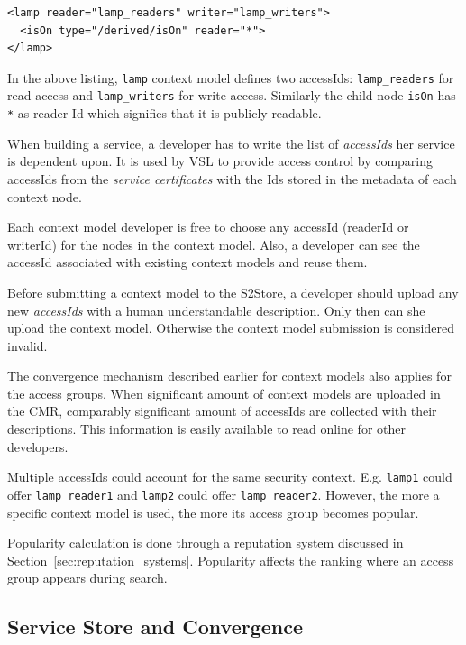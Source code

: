 \begin{lstlisting}[caption=Listing of lamp context model with \texttt{readerId} and \texttt{writerId} permissions.]
<lamp reader="lamp_readers" writer="lamp_writers">
  <isOn type="/derived/isOn" reader="*">
</lamp>
\end{lstlisting}

In the above listing, \texttt{lamp} context model defines two accessIds: \texttt{lamp\_readers} for read access and \texttt{lamp\_writers} for write access. Similarly the child node \texttt{isOn} has \texttt{*} as reader Id which signifies that it is publicly readable.

When building a service, a developer has to write the list of \emph{accessIds} her service is dependent upon. It is used by VSL to provide access control by comparing accessIds from the \emph{service certificates} with the Ids stored in the metadata of each context node.

Each context model developer is free to choose any accessId (readerId or writerId) for the nodes in the context model. Also, a developer can see the accessId associated with existing context models and reuse them.

Before submitting a context model to the S2Store, a developer should upload any new \emph{accessIds} with a human understandable description. Only then can she upload the context model. Otherwise the context model submission is considered invalid.

The convergence mechanism described earlier for context models also applies for the access groups. When significant amount of context models are uploaded in the CMR, comparably significant amount of accessIds are collected with their descriptions. This information is easily available to read online for other developers.

Multiple accessIds could account for the same security context. E.g. \texttt{lamp1} could offer \texttt{lamp\_reader1} and \texttt{lamp2} could offer \texttt{lamp\_reader2}. However, the more a specific context model is used, the more its access group becomes popular.

Popularity calculation is done through a reputation system discussed in Section~\ref{sec:reputation_systems}. Popularity affects the ranking where an access group appears during search.

\subsection{Service Store and Convergence}

